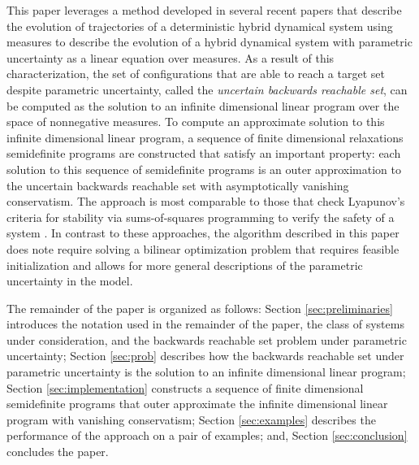 This paper leverages a method developed in several recent papers \cite{henrion2014convex,majumdar2014convex,shia2014convex} that describe the evolution of trajectories of a deterministic hybrid dynamical system using measures to describe the evolution of a hybrid dynamical system with parametric uncertainty as a linear equation over measures. 
As a result of this characterization, the set of configurations that are able to reach a target set despite parametric uncertainty, called the \emph{uncertain backwards reachable set}, can be computed as the solution to an infinite dimensional linear program over the space of nonnegative measures. 
To compute an approximate solution to this infinite dimensional linear program, a sequence of finite dimensional relaxations semidefinite programs are constructed that satisfy an important property:
each solution to this sequence of semidefinite programs is an outer approximation to the uncertain backwards reachable set with asymptotically vanishing conservatism.
The approach is most comparable to those that check Lyapunov's criteria for stability via sums-of-squares programming to verify the safety of a system \cite{prajna2004safety}.
In contrast to these approaches, the algorithm described in this paper does note require solving a bilinear optimization problem that requires feasible initialization and allows for more general descriptions of the parametric uncertainty in the model.

The remainder of the paper is organized as follows: 
Section \ref{sec:preliminaries} introduces the notation used in the remainder of the paper, the class of systems under consideration, and the backwards reachable set problem under parametric uncertainty; 
Section \ref{sec:prob} describes how the backwards reachable set under parametric uncertainty is the solution to an infinite dimensional linear program; 
Section \ref{sec:implementation} constructs a sequence of finite dimensional semidefinite programs that outer approximate the infinite dimensional linear program with vanishing conservatism; 
Section \ref{sec:examples} describes the performance of the approach on a pair of examples; 
and, Section \ref{sec:conclusion} concludes the paper. 